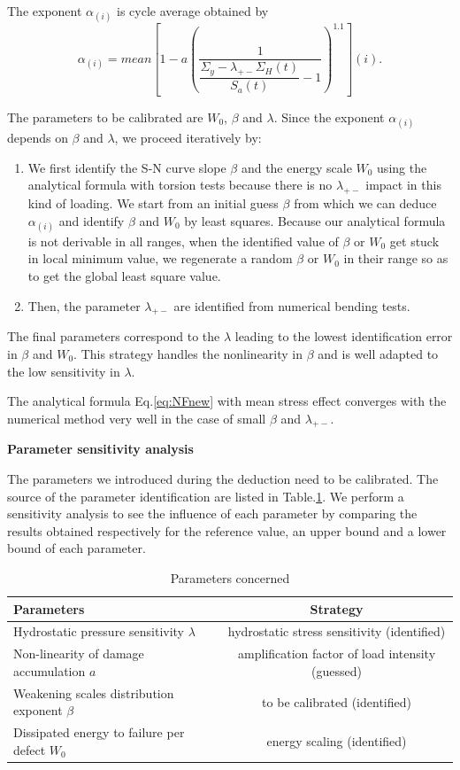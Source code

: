 \documentclass[3p,times,number,review]{elsarticle}
\begin{document}
The exponent $\alpha_{(i)}$ is cycle average obtained by $$\alpha_{(i)}=mean\left[1-a\left( \dfrac{1}{\dfrac{\Sigma_y-\lambda_{+-} \Sigma_{H}(t)}{S_{a}(t)}-1 } \right)^{1.1}\right] (i).$$

The parameters to be calibrated are $W_0$, $\beta$ and $\lambda$. Since the exponent $\alpha_{(i)}$ depends on $\beta$ and $\lambda$, we proceed iteratively by:

\begin{enumerate}
	\item We first identify the S-N curve slope $\beta$ and the energy scale $W_0$ using the analytical formula with torsion tests because there is no $\lambda_{+-}$ impact in this kind of loading. We start from an initial guess $\beta$ from which we can deduce $\alpha_{(i)}$ and identify $\beta$ and $W_0$ by least squares. Because our analytical formula is not derivable in all ranges, when the identified value of $\beta$ or $W_0$ get stuck in local minimum value, we regenerate a random $\beta$ or $W_0$ in their range so as to get the global least square value.
	\item Then, the parameter $\lambda_{+-}$ are identified from numerical bending tests.
\end{enumerate}

The final parameters correspond to the $\lambda$ leading to the lowest identification error in $\beta$ and $W_0$. This strategy handles the nonlinearity in $\beta$ and is well adapted to the low sensitivity in $\lambda$.

The analytical formula Eq.\eqref{eq:NFnew} with mean stress effect converges with the numerical method very well in the case of small $\beta$ and $\lambda_{+-}$. 


\textbf{Parameter sensitivity analysis}

The parameters we introduced during the deduction need to be calibrated. The source of the parameter identification are listed in Table.\ref{paras}.
We perform a sensitivity analysis to see the influence of each parameter by comparing the results obtained respectively for the reference value, an upper bound and a lower bound of each parameter.

\begin{table}[!h]
	\centering
	\begin{tabular}{l|c}
		\hline
		\textbf{Parameters}                                  & \multicolumn{1}{c}{\textbf{Strategy}} \\ \hline
		Hydrostatic pressure sensitivity $\lambda$           & hydrostatic stress sensitivity (identified)         \\
		Non-linearity of damage accumulation  $a$        & amplification factor of load intensity (guessed)     \\
		Weakening scales distribution exponent  $\beta$      & to be calibrated (identified)                   \\
		Dissipated energy to failure per defect  $W_0$ & energy scaling (identified)              \\ \hline
	\end{tabular}
	\caption{Parameters concerned}
	\label{paras}
\end{table}
\end{document}
